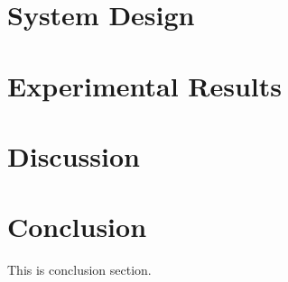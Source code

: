\documentclass[10pt, a4paper, twoside, twocolumn, technote]{IEEEtran}
\begin{document}
\section{System Design}\label{design}


\section{Experimental Results}\label{experiment}


\section{Discussion}\label{discussion}


\section{Conclusion}\label{conclusion}
This is conclusion section.





\end{document}
